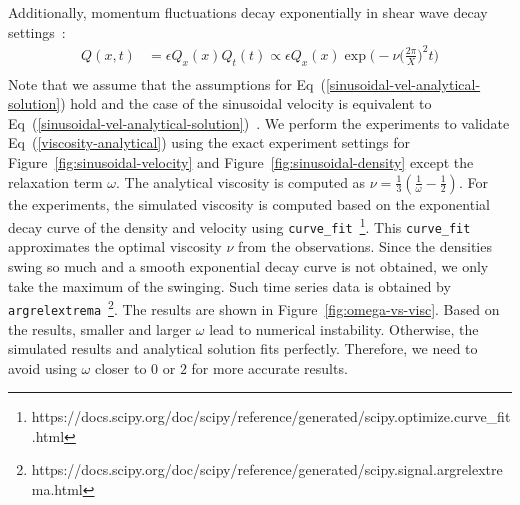 Additionally,
momentum fluctuations decay exponentially in shear wave decay settings~\cite{palmer1994transverse, hess2002determining}:
\begin{equation}
  \begin{aligned}
    Q(x, t) &=
    \epsilon Q_x(x) Q_t(t) \propto
    \epsilon Q_x(x) \exp\biggl(
      -\nu \biggl(
        \frac{2\pi}{X}
      \biggr)^2 t\biggr)  \\
  \end{aligned}
  \label{viscosity-analytical}
\end{equation}
Note that we assume that the assumptions for Eq~(\ref{sinusoidal-vel-analytical-solution}) hold
and the case of the sinusoidal velocity is equivalent to Eq~(\ref{sinusoidal-vel-analytical-solution})~\cite{fei2018three}.
We perform the experiments to validate Eq~(\ref{viscosity-analytical}) using 
the exact experiment settings for Figure~\ref{fig:sinusoidal-velocity}
and Figure~\ref{fig:sinusoidal-density}
except the relaxation term $\omega$.
The analytical viscosity is computed as $\nu = \frac{1}{3} (\frac{1}{\omega} - \frac{1}{2})$.
For the experiments, the simulated viscosity is computed based on the exponential decay curve
of the density and velocity using 
{\tt curve\_fit}~\footnote{https://docs.scipy.org/doc/scipy/reference/generated/scipy.optimize.curve\_fit.html}.
This {\tt curve\_fit} approximates the optimal viscosity $\nu$ from the observations.
Since the densities swing so much and a smooth exponential decay curve
is not obtained, we only take the maximum of the swinging.
Such time series data is obtained by
{\tt argrelextrema}~\footnote{https://docs.scipy.org/doc/scipy/reference/generated/scipy.signal.argrelextrema.html}.
The results are shown in Figure~\ref{fig:omega-vs-visc}.
Based on the results, smaller and larger $\omega$ lead to numerical instability.
Otherwise, the simulated results and analytical solution fits perfectly.
Therefore, we need to avoid using $\omega$ closer to $0$ or $2$ for more accurate results.

